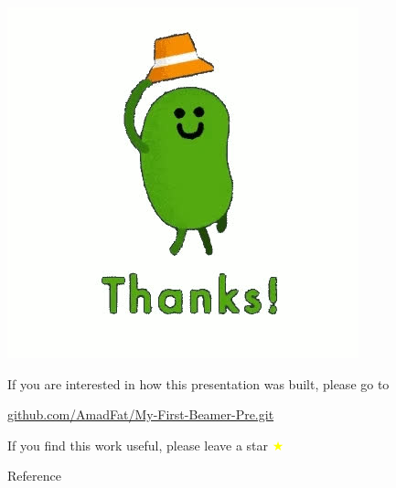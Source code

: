 \documentclass{beamer}
\begin{document}
\appendix

\begin{frame}
\centering
\includegraphics[width=0.3\linewidth]{thanks.jpg}

\vspace{5mm}

\centering
\small
\hypersetup{urlcolor=blue}
\textcolor{gray!50}{If you are interested in how this presentation was built, please go to}

\centering
\href{https://github.com/AmadFat/My-First-Beamer-Pre.git}{\textcolor{blue!50}{github.com/AmadFat/My-First-Beamer-Pre.git}}

\centering
\textcolor{gray!50}{If you find this work useful, please leave a star} 
\huge
\textcolor{yellow}{$\bigstar$}

\end{frame}

\appendix
\begin{frame}[allowframebreaks]{Reference}
\fontsize{2mm}{1mm}\selectfont


\end{frame}
\end{document}
